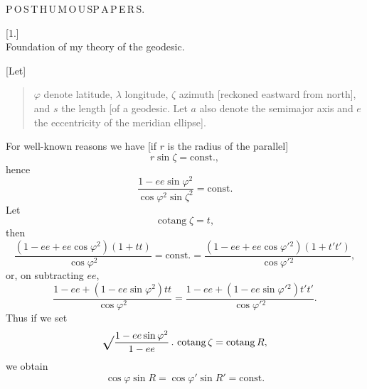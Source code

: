 \begingroup
\setlength{\abovedisplayskip}{6pt}
\setlength{\belowdisplayskip}{6pt}
\setlength{\abovedisplayshortskip}{3pt}
\setlength{\belowdisplayshortskip}{4pt}
\def\ixrad{\mathord{\vcenter{\hbox{\Large\(\surd\)}}}}
\def\ixeq#1#2{%
  \par\noindent\hspace{.06\linewidth}%
  \makebox[.10\linewidth][l]{#1}%
  \makebox[.68\linewidth][c]{\(\displaystyle #2\)}\par\smallskip}
\def\ixmathdots#1{\mathinner{\ifcase#1\or.\or.\,.\or.\,.\,.\or.\,.\,.\,.\or.\,.\,.\,.\,.\fi}}
\def\ixpoints#1{\(\ixmathdots{#1}\)}

\par\clearpage

\vspace*{.10\textheight}
\begin{center}{\LARGE P\,O\,S\,T\,H\,U\,M\,O\,U\,S\quad P\,A\,P\,E\,R\,S.}\end{center}
\vspace{.05\textheight}
\begin{center}
[1.]\\[.5ex]
Foundation of my theory of the geodesic.
\end{center}

[Let]
\begin{quote}
\(\varphi\) denote latitude, \(\lambda\) longitude, \(\zeta\) azimuth [reckoned eastward from north], and \(s\) the length
[of a geodesic. Let \(a\) also denote the semimajor axis and \(e\) the
eccentricity of the meridian ellipse].
\end{quote}

For well-known reasons we have [if \(r\) is the radius of the parallel]
\[
r\sin\zeta=\text{const.},
\]
\noindent hence
\[
\frac{1-ee\sin\varphi^2}{\cos\varphi^2\sin\zeta^2}=\text{const.}
\]
Let
\[
\operatorname{cotang}\zeta=t,
\]
\noindent then
\[
\frac{(1-ee+ee\cos\varphi^2)(1+tt)}{\cos\varphi^2}
=\text{const.}=
\frac{(1-ee+ee\cos\varphi'{}^2)(1+t't')}{\cos\varphi'{}^2},
\]
\noindent or, on subtracting \(ee\),
\[
\frac{1-ee+(1-ee\sin\varphi^2)tt}{\cos\varphi^2}
=\frac{1-ee+(1-ee\sin\varphi'{}^2)t't'}{\cos\varphi'{}^2}.
\]
Thus if we set
\[
\ixrad\frac{1-ee\sin\varphi^2}{1-ee}\,.\,\operatorname{cotang}\zeta
=\operatorname{cotang}R,
\]
\noindent we obtain
\[
\cos\varphi\sin R=\cos\varphi'\sin R'=\text{const.}
\]

\par\clearpage
\noindent\makebox[12mm][l]{}\par\medskip

